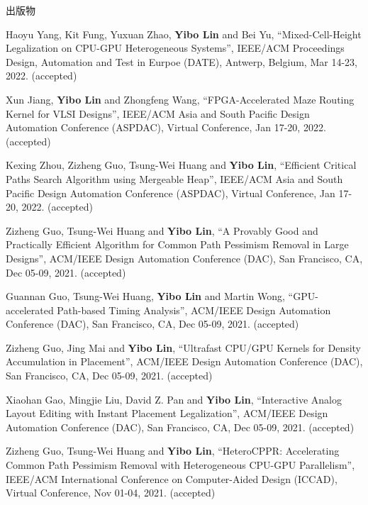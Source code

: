 \begin{rSection}{出版物}
\begin{description}[font=\normalfont]
\item[{[C57]}]{
        Haoyu Yang, Kit Fung, Yuxuan Zhao, \textbf{Yibo Lin} and Bei Yu, 
    ``Mixed-Cell-Height Legalization on CPU-GPU Heterogeneous Systems'', 
    IEEE/ACM Proceedings Design, Automation and Test in Eurpoe (DATE), Antwerp, Belgium, Mar 14-23, 2022.
    (accepted)
}
            

\item[{[C56]}]{
        Xun Jiang, \textbf{Yibo Lin} and Zhongfeng Wang, 
    ``FPGA-Accelerated Maze Routing Kernel for VLSI Designs'', 
    IEEE/ACM Asia and South Pacific Design Automation Conference (ASPDAC), Virtual Conference, Jan 17-20, 2022.
    (accepted)
}
            

\item[{[C55]}]{
        Kexing Zhou, Zizheng Guo, Tsung-Wei Huang and \textbf{Yibo Lin}, 
    ``Efficient Critical Paths Search Algorithm using Mergeable Heap'', 
    IEEE/ACM Asia and South Pacific Design Automation Conference (ASPDAC), Virtual Conference, Jan 17-20, 2022.
    (accepted)
}
            

\item[{[C54]}]{
        Zizheng Guo, Tsung-Wei Huang and \textbf{Yibo Lin}, 
    ``A Provably Good and Practically Efficient Algorithm for Common Path Pessimism Removal in Large Designs'', 
    ACM/IEEE Design Automation Conference (DAC), San Francisco, CA, Dec 05-09, 2021.
    (accepted)
}
            

\item[{[C53]}]{
        Guannan Guo, Tsung-Wei Huang, \textbf{Yibo Lin} and Martin Wong, 
    ``GPU-accelerated Path-based Timing Analysis'', 
    ACM/IEEE Design Automation Conference (DAC), San Francisco, CA, Dec 05-09, 2021.
    (accepted)
}
            

\item[{[C52]}]{
        Zizheng Guo, Jing Mai and \textbf{Yibo Lin}, 
    ``Ultrafast CPU/GPU Kernels for Density Accumulation in Placement'', 
    ACM/IEEE Design Automation Conference (DAC), San Francisco, CA, Dec 05-09, 2021.
    (accepted)
}
            

\item[{[C51]}]{
        Xiaohan Gao, Mingjie Liu, David Z. Pan and \textbf{Yibo Lin}, 
    ``Interactive Analog Layout Editing with Instant Placement Legalization'', 
    ACM/IEEE Design Automation Conference (DAC), San Francisco, CA, Dec 05-09, 2021.
    (accepted)
}
            

\item[{[C50]}]{
        Zizheng Guo, Tsung-Wei Huang and \textbf{Yibo Lin}, 
    ``HeteroCPPR: Accelerating Common Path Pessimism Removal with Heterogeneous CPU-GPU Parallelism'', 
    IEEE/ACM International Conference on Computer-Aided Design (ICCAD), Virtual Conference, Nov 01-04, 2021.
    (accepted)
}
            


\end{description}
\end{rSection}
